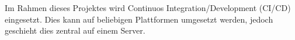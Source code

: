 Im Rahmen dieses Projektes wird Continuos Integration/Development (CI/CD) eingesetzt.
Dies kann auf beliebigen Plattformen umgesetzt werden, jedoch geschieht dies zentral auf einem Server.
